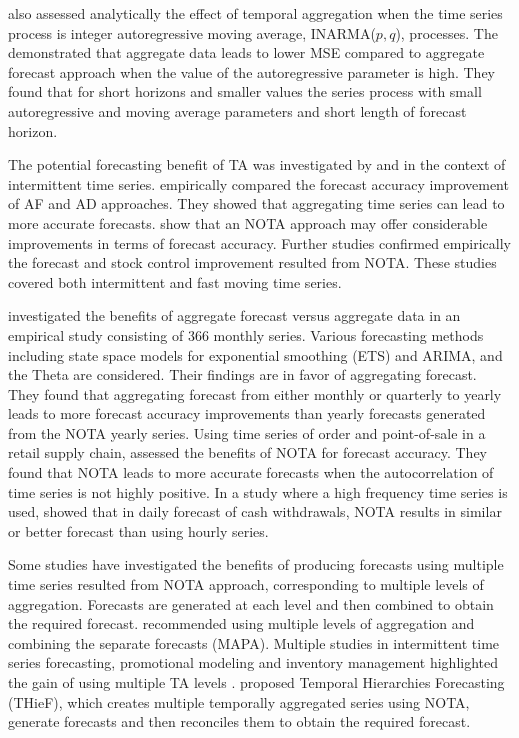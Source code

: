 \documentclass[preprint, 3p,
authoryear]{elsarticle} %
\begin{document}
\citet{mohammadipour2012forecast} also assessed analytically the effect
of temporal aggregation when the time series process is integer
autoregressive moving average, INARMA(\(p,q\)), processes. The
demonstrated that aggregate data leads to lower MSE compared to
aggregate forecast approach when the value of the autoregressive
parameter is high. They found that for short horizons and smaller values
the series process with small autoregressive and moving average
parameters and short length of forecast horizon.

The potential forecasting benefit of TA was investigated by
\citet{willemain1994forecasting} and \citet{nikolopoulos2011aggregate}
in the context of intermittent time series.
\citet{willemain1994forecasting} empirically compared the forecast
accuracy improvement of AF and AD approaches. They showed that
aggregating time series can lead to more accurate forecasts.
\citet{nikolopoulos2011aggregate} show that an NOTA approach may offer
considerable improvements in terms of forecast accuracy. Further studies
\citep{babai2012impact, petropoulos2015forecast, kourentzes2014improving, spithourakis2011improving}
confirmed empirically the forecast and stock control improvement
resulted from NOTA. These studies covered both intermittent and fast
moving time series.

\citet{athanasopoulos2011tourism} investigated the benefits of aggregate
forecast versus aggregate data in an empirical study consisting of 366
monthly series. Various forecasting methods including state space models
for exponential smoothing (ETS) and ARIMA, and the Theta are considered.
Their findings are in favor of aggregating forecast. They found that
aggregating forecast from either monthly or quarterly to yearly leads to
more forecast accuracy improvements than yearly forecasts generated from
the NOTA yearly series. Using time series of order and point-of-sale in
a retail supply chain, \citet{jin2015forecasting} assessed the benefits
of NOTA for forecast accuracy. They found that NOTA leads to more
accurate forecasts when the autocorrelation of time series is not highly
positive. In a study where a high frequency time series is used,
\citet{luna2011top} showed that in daily forecast of cash withdrawals,
NOTA results in similar or better forecast than using hourly series.

Some studies have investigated the benefits of producing forecasts using
multiple time series resulted from NOTA approach, corresponding to
multiple levels of aggregation. Forecasts are generated at each level
and then combined to obtain the required forecast.
\citet{kourentzes2014improving} recommended using multiple levels of
aggregation and combining the separate forecasts (MAPA). Multiple
studies in intermittent time series forecasting, promotional modeling
and inventory management highlighted the gain of using multiple TA
levels
\citep[\citet{barrow2016distributions}]{petropoulos2014forecast, kourentzes2015forecasting}.
\citet{athanasopoulos2017forecasting} proposed Temporal Hierarchies
Forecasting (THieF), which creates multiple temporally aggregated series
using NOTA, generate forecasts and then reconciles them to obtain the
required forecast.
\end{document}
